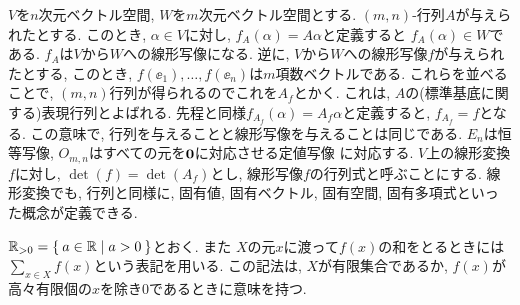 $V$を$n$次元ベクトル空間, $W$を$m$次元ベクトル空間とする.
$(m,n)$-行列$A$が与えられたとする.
このとき, $\alpha\in V$に対し, $f_A(\alpha)=A\alpha$と定義すると
$f_A(\alpha)\in W$である.
$f_A$は$V$から$W$への線形写像になる.
逆に,
$V$から$W$への線形写像$f$が与えられたとする,
このとき, $f(\ee_1),\ldots, f(\ee_n)$は$m$項数ベクトルである.
これらを並べることで, $(m,n)$行列が得られるのでこれを$A_f$とかく.
これは, $A$の(標準基底に関する)表現行列とよばれる.
先程と同様$f_{A_f}(\alpha)=A_f\alpha$と定義すると,
$f_{A_f}=f$となる.
この意味で, 行列を与えることと線形写像を与えることは同じである.
$E_n$は恒等写像, $O_{m,n}$はすべての元を$\boldsymbol{0}$に対応させる定値写像
に対応する.
$V$上の線形変換$f$に対し,
$\det(f)=\det(A_f)$とし, 線形写像$f$の行列式と呼ぶことにする.
線形変換でも, 行列と同様に, 
固有値, 固有ベクトル, 固有空間, 固有多項式といった概念が定義できる.

$\mathbb{R}_{>0}=\Set{a\in\mathbb{R}|a>0}$とおく.
また
$X$の元$x$に渡って$f(x)$の和をとるときには
$\sum_{x\in X}f(x)$という表記を用いる.
この記法は, $X$が有限集合であるか, $f(x)$が高々有限個の$x$を除き$0$であるときに意味を持つ.



